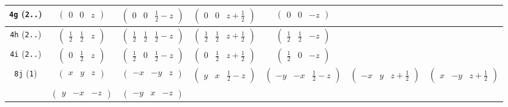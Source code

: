 \documentclass[fleqn,9pt,landscape]{jsarticle}
\begin{document}
\begin{center}
\begin{longtable}{ccccccc}
{\tt 4g} ({\tt 2..}) & $ \begin{pmatrix} 0 & 0 & z \end{pmatrix} $ & $ \begin{pmatrix} 0 & 0 & \frac{1}{2} - z \end{pmatrix} $ & $ \begin{pmatrix} 0 & 0 & z + \frac{1}{2} \end{pmatrix} $ & $ \begin{pmatrix} 0 & 0 & - z \end{pmatrix} $ & $  $ & $  $ \\ \hline
{\tt 4h} ({\tt 2..}) & $ \begin{pmatrix} \frac{1}{2} & \frac{1}{2} & z \end{pmatrix} $ & $ \begin{pmatrix} \frac{1}{2} & \frac{1}{2} & \frac{1}{2} - z \end{pmatrix} $ & $ \begin{pmatrix} \frac{1}{2} & \frac{1}{2} & z + \frac{1}{2} \end{pmatrix} $ & $ \begin{pmatrix} \frac{1}{2} & \frac{1}{2} & - z \end{pmatrix} $ & $  $ & $  $ \\ \hline
{\tt 4i} ({\tt 2..}) & $ \begin{pmatrix} 0 & \frac{1}{2} & z \end{pmatrix} $ & $ \begin{pmatrix} \frac{1}{2} & 0 & \frac{1}{2} - z \end{pmatrix} $ & $ \begin{pmatrix} 0 & \frac{1}{2} & z + \frac{1}{2} \end{pmatrix} $ & $ \begin{pmatrix} \frac{1}{2} & 0 & - z \end{pmatrix} $ & $  $ & $  $ \\ \hline
{\tt 8j} ({\tt 1}) & $ \begin{pmatrix} x & y & z \end{pmatrix} $ & $ \begin{pmatrix} - x & - y & z \end{pmatrix} $ & $ \begin{pmatrix} y & x & \frac{1}{2} - z \end{pmatrix} $ & $ \begin{pmatrix} - y & - x & \frac{1}{2} - z \end{pmatrix} $ & $ \begin{pmatrix} - x & y & z + \frac{1}{2} \end{pmatrix} $ & $ \begin{pmatrix} x & - y & z + \frac{1}{2} \end{pmatrix} $ \\
& $ \begin{pmatrix} y & - x & - z \end{pmatrix} $ & $ \begin{pmatrix} - y & x & - z \end{pmatrix} $ & $  $ & $  $ & $  $ & $  $ \\
\end{longtable}
\end{center}
\end{document}
